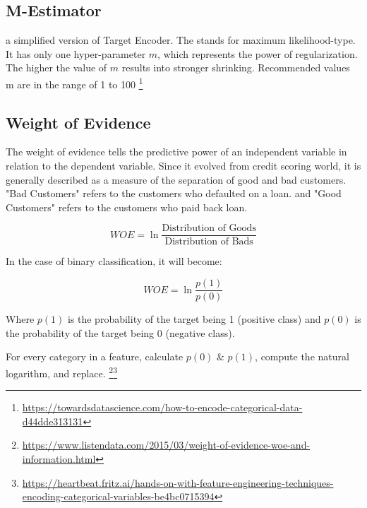 \documentclass{article}
\begin{document}
\subsection*{M-Estimator}
 a simplified version of Target Encoder. The stands for maximum likelihood-type. It has only one hyper-parameter $m$, which represents the power of regularization. The higher the value of $m$ results into stronger shrinking. Recommended values m are in the range of 1 to 100 \footnote{\url{https://towardsdatascience.com/how-to-encode-categorical-data-d44dde313131}}

\subsection*{Weight of Evidence}
The weight of evidence tells the predictive power of an independent variable in relation to the dependent variable. Since it evolved from credit scoring world, it is generally described as a measure of the separation of good and bad customers. "Bad Customers" refers to the customers who defaulted on a loan. and "Good Customers" refers to the customers who paid back loan.

\begin{equation}
WOE = \ln{\frac{\text{Distribution of Goods}}{\text{Distribution of Bads}}}
\end{equation}

\noindent In the case of binary classification, it will become:

\begin{equation}
WOE = \ln{\frac{p(1)}{p(0)}}
\end{equation}

\noindent Where $p(1)$ is the probability of the target being 1 (positive class) and $p(0)$ is the probability of the target being 0 (negative class). 

\noindent For every category in a feature, calculate $p(0)$ \& $p(1)$, compute the natural logarithm, and replace. \footnote{\url{https://www.listendata.com/2015/03/weight-of-evidence-woe-and-information.html}}\footnote{\url{https://heartbeat.fritz.ai/hands-on-with-feature-engineering-techniques-encoding-categorical-variables-be4bc0715394}}
\end{document}
